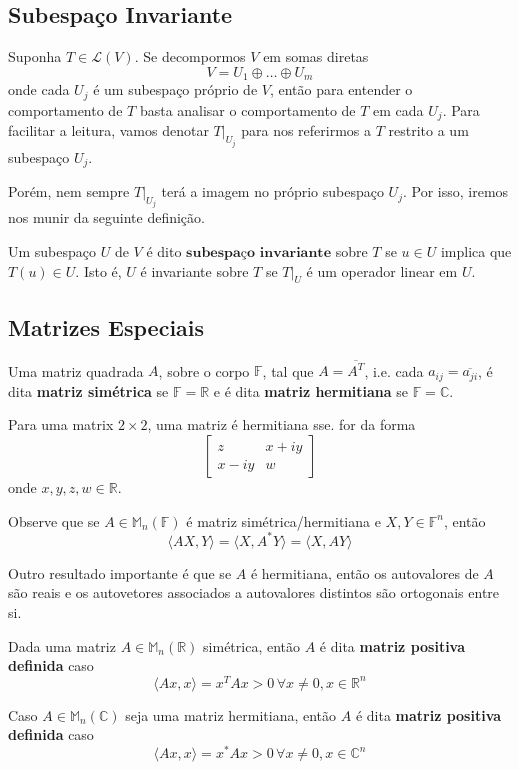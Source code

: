 \documentclass[12pt,a4paper]{article}
\begin{document}
\subsection{Subespaço Invariante}

Suponha $T \in \mathcal{L}(V)$. Se decompormos $V$ em somas diretas
\[
V = U_1 \oplus \ldots \oplus U_m
\]
onde cada $U_j$ é um subespaço próprio de $V$, então para entender o comportamento de $T$ basta analisar o comportamento de $T$ em cada $U_j$. Para facilitar a leitura, vamos denotar $T|_{U_j}$ para nos referirmos a $T$ restrito a um subespaço $U_j$.

Porém, nem sempre $T|_{U_j}$ terá a imagem no próprio subespaço ${U_j}$. Por isso, iremos nos munir da seguinte definição.

Um subespaço $U$ de $V$ é dito $\textbf{subespaço invariante}$ sobre $T$ se $u \in U$ implica que $T(u) \in U$. Isto é, $U$ é invariante sobre $T$ se $T|_U$ é um operador linear em $U$.

\subsection{Matrizes Especiais}

Uma matriz quadrada $A$, sobre o corpo $\mathbb{F}$, tal que $A = \overline{A^T}$, i.e. cada $a_{ij}= \overline{a_{ji}}$, é dita \textbf{matriz simétrica} se $\mathbb{F} = \mathbb{R}$ e é dita \textbf{matriz hermitiana} se $\mathbb{F} = \mathbb{C}$.

Para uma matrix $2 \times 2$, uma matriz é hermitiana sse. for da forma
$$
\begin{bmatrix}
	z & x+iy \\
	x-iy & w
\end{bmatrix}
$$
onde $x, y, z, w \in \mathbb{R}$.

Observe que se $A \in \mathbb{M}_n(\mathbb{F})$ é matriz simétrica/hermitiana e $X,Y \in \mathbb{F}^n$, então 
\[
\langle AX, Y \rangle = \langle X, A^{\ast} Y \rangle = \langle X, A Y \rangle
\]

Outro resultado importante é que se $A$ é hermitiana, então os autovalores de $A$ são reais e os autovetores associados a autovalores distintos são ortogonais entre si.

Dada uma matriz $A \in \mathbb{M}_n(\mathbb{R})$ simétrica, então $A$ é dita \textbf{matriz positiva definida} caso
\[
\langle Ax, x \rangle = x^T A x > 0 \, \forall x \neq 0, x \in \mathbb{R}^n
\]

Caso $A \in \mathbb{M}_n(\mathbb{C})$ seja uma matriz hermitiana, então $A$ é dita \textbf{matriz positiva definida} caso
\[
\langle Ax, x \rangle = x^{\ast} A x > 0 \, \forall x \neq 0, x \in \mathbb{C}^n
\]
\end{document}
